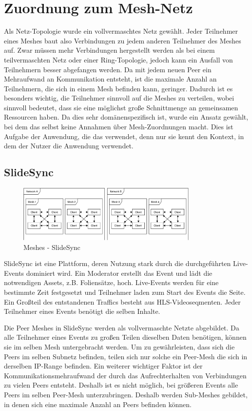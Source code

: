 \section{Zuordnung zum Mesh-Netz}\label{k:meshing}
Als Netz-Topologie wurde ein vollvermaschtes Netz gewählt. Jeder Teilnehmer eines Meshes baut also Verbindungen zu jedem anderen Teilnehmer des Meshes auf. Zwar müssen mehr Verbindungen hergestellt werden als bei einem teilvermaschten Netz oder einer Ring-Topologie, jedoch kann ein Ausfall von Teilnehmern besser abgefangen werden. Da mit jedem neuen Peer ein Mehraufwand an Kommunikation entsteht, ist die maximale Anzahl an Teilnehmern, die sich in einem Mesh befinden kann, geringer. Dadurch ist es besonders wichtig, die Teilnehmer sinnvoll auf die Meshes zu verteilen, wobei sinnvoll bedeutet, dass sie eine möglichst große Schnittmenge an gemeinsamen Ressourcen haben. Da dies sehr domänenspezifisch ist, wurde ein Ansatz gewählt, bei dem das \cdn selbst keine Annahmen über Mesh-Zuordnungen macht. Dies ist Aufgabe der Anwendung, die das \cdn verwendet, denn nur sie kennt den Kontext, in dem der Nutzer die Anwendung verwendet.

\subsection{SlideSync}
\begin{figure}[!h]
	\centering
	\includegraphics[width=0.8\textwidth]{figures/slidesync_peer_meshes}
	\caption[\pTp Meshes - SlideSync]{\pTp Meshes - SlideSync}
	\label{fig:mesh-slidesync}
\end{figure}

SlideSync ist eine Plattform, deren Nutzung stark durch die durchgeführten Live-Events dominiert wird. Ein Moderator erstellt das Event und lädt die notwendigen Assets, z.B. Foliensätze, hoch. Live-Events werden für eine bestimmte Zeit festgesetzt und Teilnehmer laden zum Start des Events die Seite. Ein Großteil des entstandenen Traffics besteht aus HLS-Videoseqmenten. Jeder Teilnehmer eines Events benötigt die selben Inhalte.

Die Peer Meshes in SlideSync werden als vollvermaschte Netzte abgebildet. Da alle Teilnehmer eines Events zu großen Teilen dieselben Daten benötigen, können sie im selben Mesh untergebracht werden. Um zu gewährleisten, dass sich die Peers im selben Subnetz befinden, teilen sich nur solche ein Peer-Mesh die sich in derselben IP-Range befinden. Ein weiterer wichtiger Faktor ist der Kommunikationsmehraufwand der durch das Aufrechterhalten von Verbindungen zu vielen Peers entsteht. Deshalb ist es nicht möglich, bei größeren Events alle Peers im selben Peer-Mesh unterzubringen. Deshalb werden Sub-Meshes gebildet, in denen sich eine maximale Anzahl an Peers befinden können.

